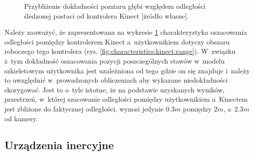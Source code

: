 		
\begin{figure}
	\centering
													
	\caption{Przybliżenie dokładności pomiaru głębi względem odległości śledzonej postaci od kontrolera Kinect [żródło własne].}
	\label{fig:characteristics:kinect:distanceAccuracy}
\end{figure}
		
Należy zauważyć, że zaprezentowana na wykresie \ref{fig:characteristics:kinect:distanceAccuracy} charakterystyka oszacowania odległości pomiędzy kontrolerem Kinect a~użytkownikiem dotyczy obszaru roboczego tego kontrolera (rys. \ref{fig:characteristics:kinect:range}). W~związku z~tym dokładność oszacowania pozycji poszczególnych stawów w~modelu szkieletowym użytkownika jest uzależniona od tego gdzie on się znajduje i~należy to uwzględnić w~prowadzonych obliczeniach aby wykazane niedokładności skorygować.
Jest to o~tyle istotne, że na podstawie uzyskanych wyników, przestrzeń, w~której szacowanie odległości pomiędzy użytkownikiem a~Kinectem jest zbliżone do faktycznej odległości, wynosi jedynie $0.3m$ pomiędzy $2m$, a~$2.3m$ od kamery.  


		
\subsection{Urządzenia inercyjne}\label{sec:characteristics:imu}
		

